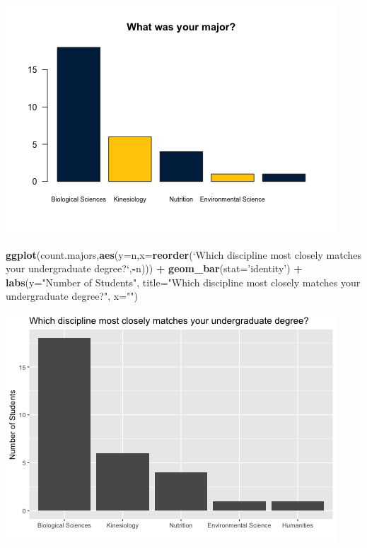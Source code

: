 \documentclass[]{article}
\newenvironment{Shaded}{\begin{snugshade}}{\end{snugshade}}
\newcommand{\KeywordTok}[1]{\textcolor[rgb]{0.13,0.29,0.53}{\textbf{#1}}}
\newcommand{\DataTypeTok}[1]{\textcolor[rgb]{0.13,0.29,0.53}{#1}}
\newcommand{\StringTok}[1]{\textcolor[rgb]{0.31,0.60,0.02}{#1}}
\newcommand{\OperatorTok}[1]{\textcolor[rgb]{0.81,0.36,0.00}{\textbf{#1}}}
\newcommand{\NormalTok}[1]{#1}
\begin{document}
\includegraphics{figures/majors-summary-1.png}

\begin{Shaded}
\begin{Highlighting}[]
\KeywordTok{ggplot}\NormalTok{(count.majors,}\KeywordTok{aes}\NormalTok{(}\DataTypeTok{y=}\NormalTok{n,}\DataTypeTok{x=}\KeywordTok{reorder}\NormalTok{(}\StringTok{`}\DataTypeTok{Which discipline most closely matches your undergraduate degree?}\StringTok{`}\NormalTok{,}\OperatorTok{-}\NormalTok{n))) }\OperatorTok{+}
\StringTok{         }\KeywordTok{geom_bar}\NormalTok{(}\DataTypeTok{stat=}\StringTok{'identity'}\NormalTok{) }\OperatorTok{+}
\StringTok{  }\KeywordTok{labs}\NormalTok{(}\DataTypeTok{y=}\StringTok{"Number of Students"}\NormalTok{,}
       \DataTypeTok{title=}\StringTok{"Which discipline most closely matches your undergraduate degree?"}\NormalTok{,}
       \DataTypeTok{x=}\StringTok{""}\NormalTok{)}
\end{Highlighting}
\end{Shaded}

\includegraphics{figures/majors-summary-2.png}
\end{document}
